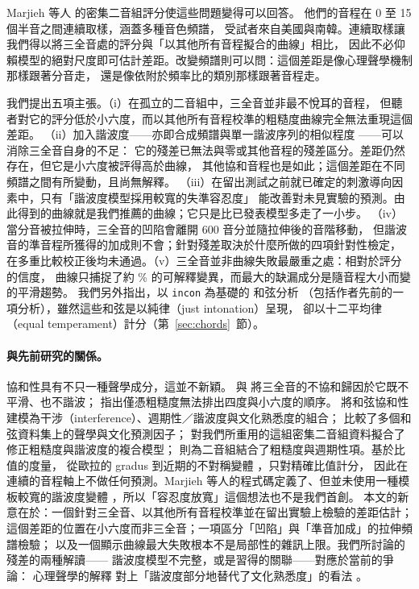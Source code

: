 \documentclass[11pt,a4paper]{article}
\begin{document}
Marjieh 等人 \citeyearpar{marjieh2024} 的密集二音組評分使這些問題變得可以回答。
他們的音程在 0 至 15 個半音之間連續取樣，涵蓋多種音色頻譜，
受試者來自美國與南韓。連續取樣讓我們得以將三全音處的評分與「以其他所有音程擬合的曲線」相比，
因此不必仰賴模型的絕對尺度即可估計差距。改變頻譜則可以問：這個差距是像心理聲學機制那樣跟著分音走，
還是像依附於頻率比的類別那樣跟著音程走。

我們提出五項主張。（i）在孤立的二音組中，三全音並非最不悅耳的音程，
但聽者對它的評分低於小六度，而以其他所有音程校準的粗糙度曲線完全無法重現這個差距。
（ii）加入諧波度——亦即合成頻譜與單一諧波序列的相似程度
\citep{terhardt1974,parncutt1989,harrison2020,bowling2015}——可以消除三全音自身的不足：
它的殘差已無法與零或其他音程的殘差區分。差距仍然存在，但它是小六度被評得高於曲線，
其他協和音程也是如此；這個差距在不同頻譜之間有所變動，且尚無解釋。
（iii）在留出測試之前就已確定的刺激導向因素中，只有「諧波度模型採用較寬的失準容忍度」
能改善對未見實驗的預測。由此得到的曲線就是我們推薦的曲線；它只是比已發表模型多走了一小步。
（iv）當分音被拉伸時，三全音的凹陷會離開 600 音分並隨拉伸後的音階移動，
但諧波音的準音程所獲得的加成則不會；針對殘差取決於什麼所做的四項針對性檢定，
在多重比較校正後均未通過。（v）三全音並非曲線失敗最嚴重之處：相對於評分的信度，
曲線只捕捉了約 \shBaseFrac\% 的可解釋變異，而最大的缺漏成分是隨音程大小而變的平滑趨勢。
我們另外指出，以 \texttt{incon} 為基礎的 \citet{bowling2018} 和弦分析
（包括作者先前的一項分析），雖然這些和弦是以純律（just intonation）呈現，
卻以十二平均律（equal temperament）計分（第~\ref{sec:chords}~節）。

\paragraph{與先前研究的關係。}
協和性具有不只一種聲學成分，這並不新穎。\citet{parncutt1989} 與 \citet{parncutt2011}
將三全音的不協和歸因於它既不平滑、也不諧波；\citet{parncutt2019} 指出僅憑粗糙度無法排出四度與小六度的順序。
\citet{harrison2020} 將和弦協和性建模為干涉（interference）、週期性／諧波度與文化熟悉度的組合；
\citet{eerola2021} 比較了多個和弦資料集上的聲學與文化預測因子；
\citet{marjieh2024} 對我們所重用的這組密集二音組資料擬合了修正粗糙度與諧波度的複合模型；
\citet{masina2022} 則為二音組結合了粗糙度與週期性項。基於比值的度量，
從歐拉的 gradus 到近期的不對稱變體 \citep{deroure2026}，只對精確比值計分，
因此在連續的音程軸上不做任何預測。Marjieh 等人的程式碼定義了、但並未使用一種模板較寬的諧波度變體
\citep{marjieh2024code}，所以「容忍度放寬」這個想法也不是我們首創。
本文的新意在於：一個針對三全音、以其他所有音程校準並在留出實驗上檢驗的差距估計；
這個差距的位置在小六度而非三全音；一項區分「凹陷」與「準音加成」的拉伸頻譜檢驗；
以及一個顯示曲線最大失敗根本不是局部性的雜訊上限。我們所討論的殘差的兩種解讀——
諧波度模型不完整，或是習得的關聯——對應於當前的爭論：
心理聲學的解釋 \citep{harrison2020,marjieh2024} 對上「諧波度部分地替代了文化熟悉度」的看法
\citep{lahdelma2022,mcdermott2016,milne2023}。
\end{document}
